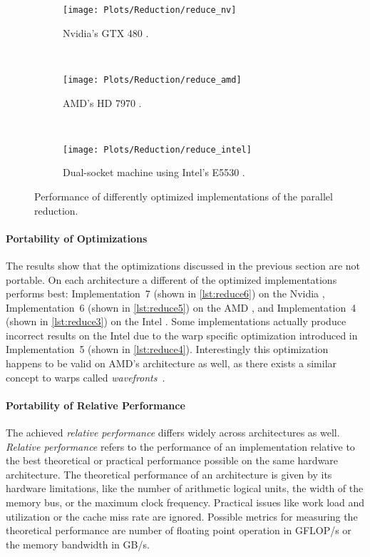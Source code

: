 \begin{figure}[p]
  \centering
\begin{subfigure}{\linewidth}
  \texttt{[image: Plots/Reduction/reduce\_nv]}
  \caption{Nvidia's GTX 480 \GPU.}
  \label{fig:reduce:nvidia}
\end{subfigure}\\
\begin{subfigure}{\linewidth}
  \texttt{[image: Plots/Reduction/reduce\_amd]}
  \caption{AMD's HD 7970 \GPU.}
  \label{fig:reduce:amd}
\end{subfigure}\\
\begin{subfigure}{\linewidth}
  \texttt{[image: Plots/Reduction/reduce\_intel]}
    \caption{Dual-socket machine using Intel's E5530 \CPU.}
  \label{fig:reduce:intel}
\end{subfigure}
  \caption{Performance of differently optimized implementations of the parallel reduction.}
  \label{fig:reduce:overview}
\end{figure}


\paragraph{Portability of Optimizations}
The results show that the optimizations discussed in the previous section are not portable. 
On each architecture a different of the optimized implementations performs best:
Implementation~7 (shown in \autoref{lst:reduce6}) on the Nvidia \GPU, Implementation~6 (shown in \autoref{lst:reduce5}) on the AMD \GPU, and Implementation~4 (shown in \autoref{lst:reduce3}) on the Intel \CPU.
Some implementations actually produce incorrect results on the Intel \CPU due to the warp specific optimization introduced in Implementation~5 (shown in \autoref{lst:reduce4}).
Interestingly this optimization happens to be valid on AMD's \GPU architecture as well, as there exists a similar concept to warps called \emph{wavefronts}~\cite{}.

\paragraph{Portability of Relative Performance}
The achieved \emph{relative performance} differs widely across architectures as well.
\emph{Relative performance} refers to the performance of an implementation relative to the best theoretical or practical performance possible on the same hardware architecture.
The theoretical performance of an architecture is given by its hardware limitations, like the number of arithmetic logical units, the width of the memory bus, or the maximum clock frequency.
Practical issues like work load and utilization or the cache miss rate are ignored.
Possible metrics for measuring the theoretical performance are number of floating point operation in GFLOP/s or the memory bandwidth in GB/s.

